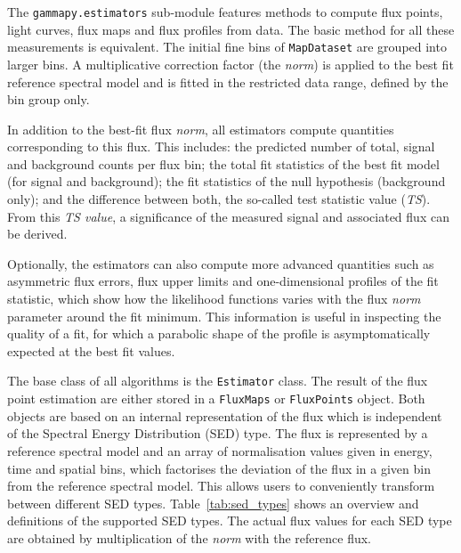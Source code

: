 \documentclass[longauth]{aa}
\newcommand{\code}[1]{\texttt{#1}}
\begin{document}
The \code{gammapy.estimators} sub-module features methods to compute flux
points, light curves, flux maps and flux profiles from data.
The basic method for all these measurements is equivalent.
The initial fine bins of \code{MapDataset} are grouped into
larger bins. A multiplicative correction factor (the \textit{norm})
is applied to the best fit reference spectral
model and is fitted in the restricted data range, defined by the 
bin group only.

In addition to the best-fit flux \textit{norm}, all estimators compute
quantities corresponding to this flux. This includes:
the predicted number of total, signal and background
counts per flux bin; the total fit statistics
of the best fit model (for signal and background); the fit statistics of the
null hypothesis (background only); and the difference between both,
the so-called test statistic value (\textit{TS}).
From this \textit{TS value}, a significance of the measured signal and associated flux
can be derived.

Optionally, the estimators can also compute more advanced quantities
such as asymmetric flux errors, flux upper limits
and one-dimensional profiles of the fit statistic,
which show how the likelihood functions varies with
the flux \textit{norm} parameter around the fit minimum.
This information is useful in inspecting the quality
of a fit, for which a parabolic
shape of the profile is asymptomatically expected at the best fit
values.

The base class of all algorithms is the \code{Estimator}  class.
The result of the flux point estimation are either stored in a
\code{FluxMaps} or \code{FluxPoints} object. Both objects
are based on an internal representation of the flux which is
independent of the Spectral Energy Distribution (SED) type. The flux is represented
by a reference spectral model and an array of
normalisation values given in energy, time and spatial bins,
which factorises the deviation of the flux in a given
bin from the reference spectral model. This allows
users to conveniently transform between different
SED types. Table~\ref{tab:sed_types} shows an
overview and definitions of the supported SED types.
The actual flux values for each SED type are obtained
by multiplication of the \textit{norm} with the reference flux.
\end{document}
